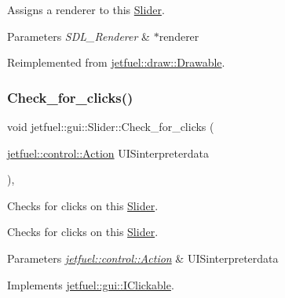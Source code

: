 Assigns a renderer to this \hyperlink{classjetfuel_1_1gui_1_1Slider}{Slider}.


\begin{DoxyParams}{Parameters}
{\em S\+D\+L\+\_\+\+Renderer} & $\ast$renderer \\
\hline
\end{DoxyParams}


Reimplemented from \hyperlink{classjetfuel_1_1draw_1_1Drawable_a0d7257f197d6ffcdd89c3a99c93d1400}{jetfuel\+::draw\+::\+Drawable}.

\mbox{\label{classjetfuel_1_1gui_1_1Slider_a8a1e83cfea8d65db34da7447dce9fb6f}} 
\subsubsection{\texorpdfstring{Check\+\_\+for\+\_\+clicks()}{Check\_for\_clicks()}}
{\footnotesize\ttfamily void jetfuel\+::gui\+::\+Slider\+::\+Check\+\_\+for\+\_\+clicks (\begin{DoxyParamCaption}\item[{\hyperlink{structjetfuel_1_1control_1_1Action}{jetfuel\+::control\+::\+Action}}]{U\+I\+Sinterpreterdata }\end{DoxyParamCaption})\hspace{0.3cm}{\ttfamily [override]}, {\ttfamily [virtual]}}



Checks for clicks on this \hyperlink{classjetfuel_1_1gui_1_1Slider}{Slider}. 

Checks for clicks on this \hyperlink{classjetfuel_1_1gui_1_1Slider}{Slider}.


\begin{DoxyParams}{Parameters}
{\em \hyperlink{structjetfuel_1_1control_1_1Action}{jetfuel\+::control\+::\+Action}} & U\+I\+Sinterpreterdata \\
\hline
\end{DoxyParams}


Implements \hyperlink{classjetfuel_1_1gui_1_1IClickable_aea45de37bd3beb7eb7e2e3056e4e37b3}{jetfuel\+::gui\+::\+I\+Clickable}.

\mbox{\label{classjetfuel_1_1gui_1_1Slider_a483038c689276ed8468e990977e5a74a}} 
